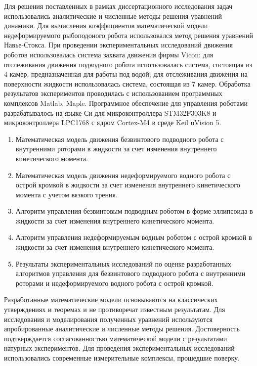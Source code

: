 {\methods} Для решения поставленных в рамках диссертационного исследования задач использовались аналитические и численные методы решения уравнений динамики. Для вычисления коэффициентов математической модели недеформируемого рыбоподоного робота использовался метод решения уравнений Навье-Стокса. При проведении экспериментальных исследований движения роботов использовалась система захвата движения фирмы Vicon: для отслеживания движения подводного робота использовалась система, состоящая из 4 камер, предназначенная для работы под водой; для отслеживания движения на поверхности жидкости использовалась система, состоящая из 7 камер. Обработка результатов экспериментов проводилась с использованием программных комплексов Matlab, Maple. Программное обеспечение для управления роботами разрабатывалось на языке Си для микроконтроллера STM32F303K8 и микроконтроллера LPC1768 с ядром Cortex-M4 в среде Keil uVision 5.

{}
\begin{enumerate}
  \item Математическая модель движения безвинтового подводного робота с внутренними роторами в жидкости за счет изменения внутреннего кинетического момента.
  \item Математическая модель движения недеформируемого водного робота с острой кромкой в жидкости за счет изменения внутреннего кинетического момента с учетом вязкого трения.
  \item Алгоритм управления безвинтовым подводным роботом в форме эллипсоида в жидкости за счет изменения внутреннего кинетического момента.
  \item Алгоритм управления недеформируемым водным роботом с острой кромкой в жидкости за счет изменения внутреннего кинетического момента.
  \item Результаты экспериментальных исследований по оценке разработанных алгоритмов управления для безвинтового подводного робота с внутренними роторами и недеформируемого водного робота с острой кромкой.
  
\end{enumerate}

{\reliability} Разработанные математические модели основываются на классических утверждениях и теоремах и не противоречат известным результатам. Для исследования и моделирования полученных уравнений используются апробированные аналитические и численные методы решения. Достоверность подтверждается согласованностью математической модели с результатами натурных экспериментов. Для проведения экспериментальных исследований использовались современные измерительные комплексы, прошедшие поверку.


